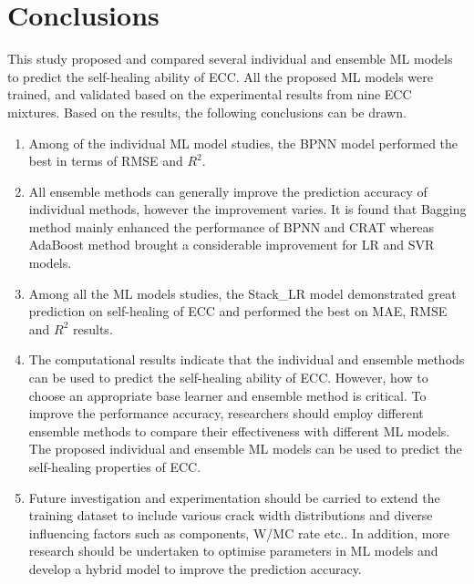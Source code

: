 \documentclass[11pt]{article}
\begin{document}
	\section{Conclusions}
	\label{con}
	
	This study proposed and compared several individual and ensemble ML models to predict the self-healing ability of ECC. All the proposed ML models were trained, and validated based on the experimental results from nine ECC mixtures. Based on the results, the following conclusions can be drawn.
	
	\begin{enumerate}
	    \item Among of the individual ML model studies, the BPNN model performed the best in terms of RMSE and $R^2$.
	    \item All ensemble methods can generally improve the prediction accuracy of individual methods, however the improvement varies. It is found that Bagging method mainly enhanced the performance of BPNN and CRAT whereas AdaBoost method brought a considerable improvement for LR and SVR models.
	    \item Among all the ML models studies, the Stack\_LR model demonstrated great prediction on self-healing of ECC and performed the best on MAE, RMSE and $R^2$ results. 
	    \item The computational results indicate that the individual and ensemble methods can be used to predict the self-healing ability of ECC. However, how to choose an appropriate base learner and ensemble method is critical. To improve the performance accuracy, researchers should employ different ensemble methods to compare their effectiveness with different ML models. The proposed individual and ensemble ML models can be used to predict the self-healing properties of ECC.
	    \item Future investigation and experimentation should be carried to extend the training dataset to include various crack width distributions and diverse influencing factors such as components, W/MC rate etc.. In addition, more research should be undertaken to optimise parameters in ML models and develop a hybrid model to improve the prediction accuracy.
	\end{enumerate}

	
	
\end{document}
